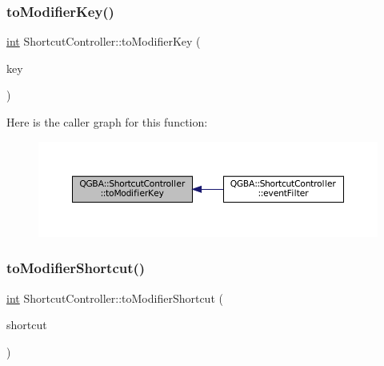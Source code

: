 \subsubsection{\texorpdfstring{to\+Modifier\+Key()}{toModifierKey()}}
{\footnotesize\ttfamily \mbox{\hyperlink{ioapi_8h_a787fa3cf048117ba7123753c1e74fcd6}{int}} Shortcut\+Controller\+::to\+Modifier\+Key (\begin{DoxyParamCaption}\item[{\mbox{\hyperlink{ioapi_8h_a787fa3cf048117ba7123753c1e74fcd6}{int}}}]{key }\end{DoxyParamCaption})\hspace{0.3cm}{\ttfamily [static]}}

Here is the caller graph for this function\+:
\nopagebreak
\begin{figure}[H]
\begin{center}
\leavevmode
\includegraphics[width=350pt]{class_q_g_b_a_1_1_shortcut_controller_a358ace743ae3c305cee270a0d54d6c82_icgraph}
\end{center}
\end{figure}
\mbox{\label{class_q_g_b_a_1_1_shortcut_controller_ab8daaf3e0879b0fd47e64b666a86a7e1}} 
\subsubsection{\texorpdfstring{to\+Modifier\+Shortcut()}{toModifierShortcut()}}
{\footnotesize\ttfamily \mbox{\hyperlink{ioapi_8h_a787fa3cf048117ba7123753c1e74fcd6}{int}} Shortcut\+Controller\+::to\+Modifier\+Shortcut (\begin{DoxyParamCaption}\item[{const Q\+String \&}]{shortcut }\end{DoxyParamCaption})\hspace{0.3cm}{\ttfamily [static]}}

